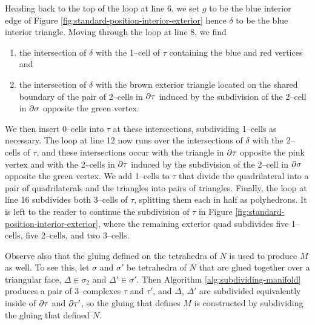 Heading back to the top of the loop at line 6, we set $g$ to be the blue interior edge of Figure \ref{fig:standard-position-interior-exterior} hence $\delta$ to be the blue interior triangle.
Moving through the loop at line 8, we find
\begin{enumerate}
	\item the intersection of $\delta$ with the 1--cell of $\tau$ containing the blue and red vertices and 
	\item the intersection of $\delta$ with the brown exterior triangle located on the shared boundary of the pair of 2--cells in $\partial\tau$ induced by the subdivision of the 2--cell in $\partial\sigma$ opposite the green vertex.
\end{enumerate}
We then insert 0--cells into $\tau$ at these intersections, subdividing 1--cells as necessary.
The loop at line 12 now runs over the intersections of $\delta$ with the 2--cells of $\tau$, and these intersections occur with the triangle in $\partial\tau$ opposite the pink vertex and with the 2--cells in $\partial\tau$ induced by the subdivision of the 2--cell in $\partial\sigma$ opposite the green vertex.
We add 1--cells to $\tau$ that divide the quadrilateral into a pair of quadrilaterals and the triangles into pairs of triangles.
Finally, the loop at line 16 subdivides both 3--cells of $\tau$, splitting them each in half as polyhedrons.
It is left to the reader to continue the subdivision of $\tau$ in Figure \ref{fig:standard-position-interior-exterior}, where the remaining exterior quad subdivides five 1--cells, five 2--cells, and two 3--cells.

Observe also that the gluing defined on the tetrahedra of $N$ is used to produce $M$ as well.
To see this, let $\sigma$ and $\sigma'$ be tetrahedra of $N$ that are glued together over a triangular face, $\Delta\in\sigma_2$ and $\Delta'\in\sigma'$.
Then Algorithm \ref{alg:subdividing-manifold} produces a pair of 3--complexes $\tau$ and $\tau'$, and $\Delta$, $\Delta'$ are subdivided equivalently inside of $\partial\tau$ and $\partial\tau'$, so the gluing that defines $M$ is constructed by subdividing the gluing that defined $N$.

